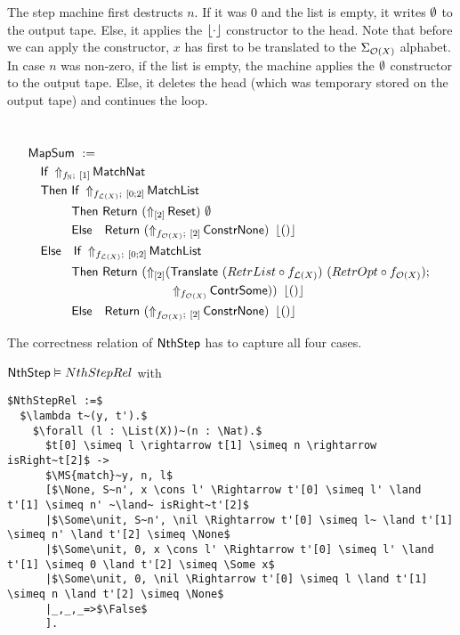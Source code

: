 The step machine first destructs $n$.  If it was $0$ and the list is empty, it writes $\emptyset$ to the output tape.  Else, it applies the $\left\lfloor {\cdot} \right\rfloor$
constructor to the head.  Note that before we can apply the constructor, $x$ has first to be translated to the $\Sigma_{\mathcal{O}(X)}$ alphabet.  In
case $n$ was non-zero, if the list is empty, the machine applies the $\emptyset$ constructor to the output tape.  Else, it deletes the head (which was
temporary stored on the output tape) and continues the loop.

\begin{definition}
  \label{def:Nth_Step}
  ~
  \begin{align*}
    & \MS{MapSum}~:= \\
    &\quad \MS{If}~\LiftBoth{\MS{MatchNat}}{f_\Nat}{\Vector{1}} \\
    &\quad \MS{Then}~ \MS{If}~\LiftBoth{\MS{MatchList}}{f_{\List(X)}}{\Vector{0;2}} \\
    &\quad \phantom{\MS{Then}}~\MS{Then}~   \Return{(\LiftTapes{\MS{Reset}}{\Vector{2}})}{\None} \\
    &\quad \phantom{\MS{Then}}~\MS{Else}~~~ \Return{(\LiftBoth{\MS{ConstrNone}}{f_{\Option(X)}}{\Vector{2}})}{\Some\unit} \\
    &\quad \MS{Else}~~~ \MS{If}~\LiftBoth{\MS{MatchList}}{f_{\List(X)}}{\Vector{0;2}} \\
    &\quad \phantom{\MS{Then}}~\MS{Then}~   \Return{(\LiftTapes{(\MS{Translate}~(RetrList \circ f_{\List(X)})~(RetrOpt \circ f_{\Option(X)}) \Seq \\
    &\quad \phantom{\phantom{\MS{Then}}~\MS{Then}~\MS{Return}}\quad\quad~~ \LiftAlphabet{\MS{ContrSome}}{f_{\Option(X)}})}{\Vector{2}})}{\Some\unit} \\
    &\quad \phantom{\MS{Then}}~\MS{Else}~~~ \Return{(\LiftBoth{\MS{ConstrNone}}{f_{\Option(X)}}{\Vector{2}})}{\Some\unit}
  \end{align*}
\end{definition}

The correctness relation of $\mathsf{NthStep}$ has to capture all four cases.

\begin{lemma}
  \label{lem:Nth_Step_Realise}
  $\mathsf{NthStep} \mathrel{\vDash} NthStepRel$ with
  \small
\begin{lstlisting}[style=semicoqstyle]
$NthStepRel :=$
  $\lambda t~(y, t').$
    $\forall (l : \List(X))~(n : \Nat).$
      $t[0] \simeq l \rightarrow t[1] \simeq n \rightarrow isRight~t[2]$ ->
      $\MS{match}~y, n, l$
      [$\None, S~n', x \cons l' \Rightarrow t'[0] \simeq l' \land t'[1] \simeq n' ~\land~ isRight~t'[2]$
      |$\Some\unit, S~n', \nil \Rightarrow t'[0] \simeq l~ \land t'[1] \simeq n' \land t'[2] \simeq \None$
      |$\Some\unit, 0, x \cons l' \Rightarrow t'[0] \simeq l' \land t'[1] \simeq 0 \land t'[2] \simeq \Some x$
      |$\Some\unit, 0, \nil \Rightarrow t'[0] \simeq l \land t'[1] \simeq n \land t'[2] \simeq \None$
      |_,_,_=>$\False$
      ].
\end{lstlisting}
\end{lemma}

